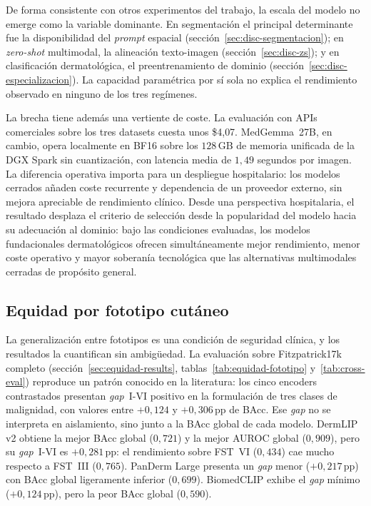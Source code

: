 De forma consistente con otros experimentos del trabajo, la escala del
modelo no emerge como la variable dominante. En segmentación el principal
determinante fue la disponibilidad del \emph{prompt} espacial
(sección~\ref{sec:disc-segmentacion}); en \emph{zero-shot} multimodal, la
alineación texto-imagen (sección~\ref{sec:disc-zs}); y en clasificación
dermatológica, el preentrenamiento de dominio
(sección~\ref{sec:disc-especializacion}). La capacidad paramétrica por sí
sola no explica el rendimiento observado en ninguno de los tres regímenes.

La brecha tiene además una vertiente de coste. La evaluación con
APIs comerciales sobre los tres datasets cuesta unos \$4{,}07.
MedGemma~27B, en cambio, opera localmente en BF16 sobre los
$128$\,GB de memoria unificada de la DGX Spark sin cuantización,
con latencia media de $1{,}49$ segundos por imagen. La diferencia
operativa importa para un despliegue hospitalario: los modelos
cerrados añaden coste recurrente y dependencia de un proveedor
externo, sin mejora apreciable de rendimiento clínico. Desde una
perspectiva hospitalaria, el resultado desplaza el criterio de selección
desde la popularidad del modelo hacia su adecuación al dominio: bajo las
condiciones evaluadas, los modelos fundacionales dermatológicos ofrecen
simultáneamente mejor rendimiento, menor coste operativo y mayor
soberanía tecnológica que las alternativas multimodales cerradas de
propósito general.

\subsection{Equidad por fototipo cutáneo}
\label{sec:disc-equidad}

La generalización entre fototipos es una condición de seguridad
clínica, y los resultados la cuantifican sin ambigüedad. La
evaluación sobre Fitzpatrick17k completo
(sección~\ref{sec:equidad-results}, tablas~\ref{tab:equidad-fototipo}
y~\ref{tab:cross-eval}) reproduce un patrón conocido en la
literatura: los cinco encoders contrastados presentan \emph{gap}~I-VI
positivo en la formulación de tres clases de malignidad, con valores
entre $+0{,}124$ y $+0{,}306$\,pp de BAcc. Ese \emph{gap} no se
interpreta en aislamiento, sino junto a la BAcc global de cada
modelo. DermLIP v2 obtiene la mejor BAcc global ($0{,}721$) y la
mejor AUROC global ($0{,}909$), pero su \emph{gap}~I-VI es
$+0{,}281$\,pp: el rendimiento sobre FST~VI ($0{,}434$) cae
mucho respecto a FST~III ($0{,}765$). PanDerm Large presenta un
\emph{gap} menor ($+0{,}217$\,pp) con BAcc global ligeramente
inferior ($0{,}699$). BiomedCLIP exhibe el \emph{gap} mínimo
($+0{,}124$\,pp), pero la peor BAcc global ($0{,}590$).

